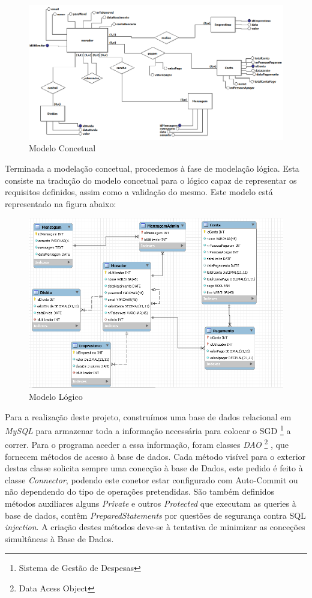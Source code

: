 \begin{figure}[htb!]
	\includegraphics[scale=0.6]{imagens/bd/modeloconcetual}  
	\caption{Modelo Concetual}  
\end{figure}

\newpage

Terminada a modelação concetual, procedemos à fase de modelação lógica. Esta consiste na tradução do modelo concetual para o lógico capaz de representar os requisitos definidos, assim como a validação do mesmo. Este modelo está representado na figura abaixo: 

\begin{figure}[htb!]
	\includegraphics[scale=0.7]{imagens/bd/modelologico}  
	\caption{Modelo Lógico}  
\end{figure}

\newpage

Para a realização deste projeto, construímos uma base de dados relacional em \textit{MySQL} para armazenar toda a informação necessária para colocar o SGD \footnote{Sistema de Gestão de Despesas} a correr. Para o programa aceder a essa informação, foram classes \textit{DAO} \footnote{Data Acess Object} , que fornecem métodos de acesso à base de dados. Cada método visível para o exterior
destas classe solicita sempre uma conecção à base de Dados, este pedido é feito à classe \textit{Connector}, podendo este conetor estar configurado com Auto-Commit ou não dependendo do tipo de operações pretendidas.
São também definidos métodos auxiliares alguns \textit{Private} e outros \textit{Protected} que executam as queries à base de dados, contêm \textit{PreparedStatements} por questões de segurança contra SQL \textit{injection}. A criação destes métodos deve-se à tentativa de minimizar as conceções simultâneas à Base de Dados.


